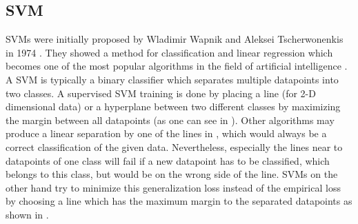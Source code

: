 \subsection{\acf*{SVM}}
\label{sec:svm}

\acfp{SVM} were initially proposed by Wladimir Wapnik and Aleksei Tscherwonenkis in 1974 \cite{vapnik1974theory}. They showed a method for classification and linear regression which becomes one of the most popular algorithms in the field of artificial intelligence \cite{russellnorvig-ai}. A \ac{SVM} is typically a binary classifier which separates multiple datapoints into two classes. A supervised \ac{SVM} training is done by placing a line (for 2-D dimensional data) or a hyperplane between two different classes by maximizing the margin between all datapoints (as one can see in ). Other algorithms may produce a linear separation by one of the lines in , which would always be a correct classification of the given data. Nevertheless, especially the lines near to datapoints of one class will fail if a new datapoint has to be classified, which belongs to this class, but would be on the wrong side of the line. \acp{SVM} on the other hand try to minimize this generalization loss instead of the empirical loss by choosing a line which has the maximum margin to the separated datapoints as shown in .

